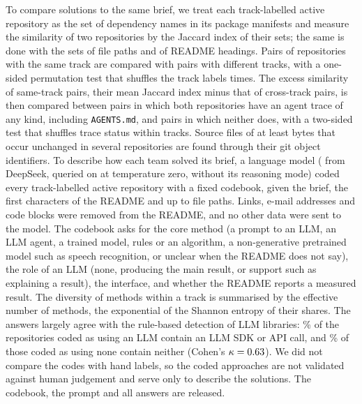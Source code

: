 \documentclass{article}
\begin{document}
To compare solutions to the same brief, we treat each track-labelled active repository as the set of dependency names in its package manifests and measure the similarity of two repositories by the Jaccard index of their sets; the same is done with the sets of file paths and of README headings. Pairs of repositories with the same track are compared with pairs with different tracks, with a one-sided permutation test that shuffles the track labels \solruns{} times. The excess similarity of same-track pairs, their mean Jaccard index minus that of cross-track pairs, is then compared between pairs in which both repositories have an agent trace of any kind, including \texttt{AGENTS.md}, and pairs in which neither does, with a two-sided test that shuffles trace status within tracks. Source files of at least \minbytes{} bytes that occur unchanged in several repositories are found through their git object identifiers. To describe how each team solved its brief, a language model (\NRqThreeApproachModel{} from DeepSeek, queried on \codebookdate{} at temperature zero, without its reasoning mode) coded every track-labelled active repository with a fixed codebook, given the brief, the first \readmechars{} characters of the README and up to \maxpaths{} file paths. Links, e-mail addresses and code blocks were removed from the README, and no other data were sent to the model. The codebook asks for the core method (a prompt to an LLM, an LLM agent, a trained model, rules or an algorithm, a non-generative pretrained model such as speech recognition, or unclear when the README does not say), the role of an LLM (none, producing the main result, or support such as explaining a result), the interface, and whether the README reports a measured result. The diversity of methods within a track is summarised by the effective number of methods, the exponential of the Shannon entropy of their shares. The answers largely agree with the rule-based detection of LLM libraries: \NRqThreeApproachSdkGivenLlmPct\% of the repositories coded as using an LLM contain an LLM SDK or API call, and \NRqThreeApproachNoSdkGivenNoLlmPct\% of those coded as using none contain neither (Cohen's $\kappa = \num{0.63}$). We did not compare the codes with hand labels, so the coded approaches are not validated against human judgement and serve only to describe the solutions. The codebook, the prompt and all answers are released.
\end{document}
